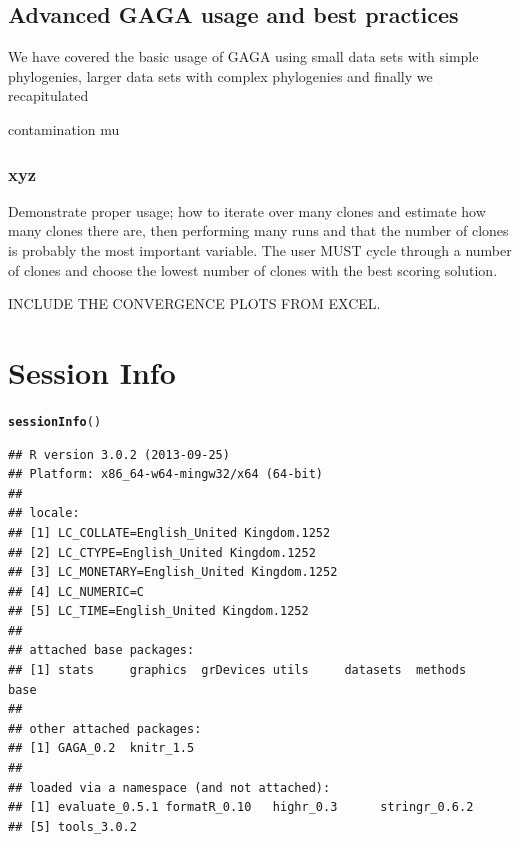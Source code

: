 \documentclass[a4paper]{article}\usepackage[]{graphicx}\usepackage[]{color}
\makeatletter
\newcommand{\hlstd}[1]{\textcolor[rgb]{0.345,0.345,0.345}{#1}}%
\newcommand{\hlkwd}[1]{\textcolor[rgb]{0.737,0.353,0.396}{\textbf{#1}}}%
\newenvironment{kframe}{%
 \def\at@end@of@kframe{}%
 \ifinner\ifhmode%
  \def\at@end@of@kframe{\end{minipage}}%
  \begin{minipage}{\columnwidth}%
 \fi\fi%
 \def\FrameCommand##1{\hskip\@totalleftmargin \hskip-\fboxsep
 \colorbox{shadecolor}{##1}\hskip-\fboxsep
     \hskip-\linewidth \hskip-\@totalleftmargin \hskip\columnwidth}%
 \MakeFramed {\advance\hsize-\width
   \@totalleftmargin\z@ \linewidth\hsize
   \@setminipage}}%
 {\par\unskip\endMakeFramed%
 \at@end@of@kframe}
\newenvironment{knitrout}{}{} %
\makeatother
\begin{document}
\subsection{Advanced GAGA usage and best practices}
We have covered the basic usage of GAGA using small data sets with simple phylogenies, larger data sets with complex phylogenies and finally we recapitulated 

contamination
mu

\subsubsection{xyz}
Demonstrate proper usage; how to iterate over many clones and estimate how many clones there are, then performing many runs
 and that the number of clones is probably the most important variable.  The user MUST cycle through a number of clones and choose the lowest number of clones with the best scoring solution.
 
INCLUDE THE CONVERGENCE PLOTS FROM EXCEL.

\section{Session Info}
\begin{knitrout}
\color{fgcolor}\begin{kframe}
\begin{alltt}
\hlkwd{sessionInfo}\hlstd{()}
\end{alltt}
\begin{verbatim}
## R version 3.0.2 (2013-09-25)
## Platform: x86_64-w64-mingw32/x64 (64-bit)
## 
## locale:
## [1] LC_COLLATE=English_United Kingdom.1252 
## [2] LC_CTYPE=English_United Kingdom.1252   
## [3] LC_MONETARY=English_United Kingdom.1252
## [4] LC_NUMERIC=C                           
## [5] LC_TIME=English_United Kingdom.1252    
## 
## attached base packages:
## [1] stats     graphics  grDevices utils     datasets  methods   base     
## 
## other attached packages:
## [1] GAGA_0.2  knitr_1.5
## 
## loaded via a namespace (and not attached):
## [1] evaluate_0.5.1 formatR_0.10   highr_0.3      stringr_0.6.2 
## [5] tools_3.0.2
\end{verbatim}
\end{kframe}
\end{knitrout}



\printbibliography[heading=bibintoc] 
\end{document}
